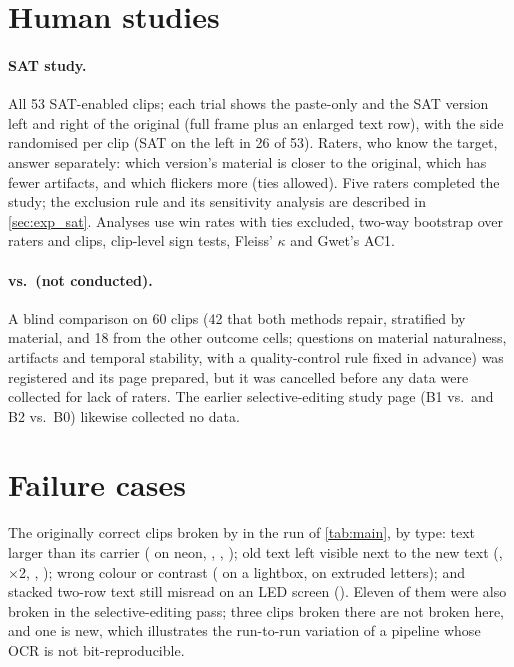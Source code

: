 \section{Human studies}
\label{sec:supp_human}
\paragraph{SAT study.} All 53 SAT-enabled clips; each trial shows the paste-only and the SAT version left and right of the original (full frame plus an enlarged text row), with the side randomised per clip (SAT on the left in 26 of 53). Raters, who know the target, answer separately: which version's material is closer to the original, which has fewer artifacts, and which flickers more (ties allowed). Five raters completed the study; the exclusion rule and its sensitivity analysis are described in \cref{sec:exp_sat}. Analyses use win rates with ties excluded, two-way bootstrap over raters and clips, clip-level sign tests, Fleiss' $\kappa$ and Gwet's AC1.

\paragraph{\method vs.\ \steer (not conducted).} A blind comparison on 60 clips (42 that both methods repair, stratified by material, and 18 from the other outcome cells; questions on material naturalness, artifacts and temporal stability, with a quality-control rule fixed in advance) was registered and its page prepared, but it was cancelled before any data were collected for lack of raters. The earlier selective-editing study page (B1 vs.\ \steer and B2 vs.\ B0) likewise collected no data.

\section{Failure cases}
\label{sec:supp_fail}
The \rOursBroken{} originally correct clips broken by \method in the run of \cref{tab:main}, by type: text larger than its carrier ( on neon, , , ); old text left visible next to the new text (,  $\times$2, , ); wrong colour or contrast ( on a lightbox,  on extruded letters); and stacked two-row text still misread on an LED screen (). Eleven of them were also broken in the selective-editing pass; three clips broken there are not broken here, and one is new, which illustrates the run-to-run variation of a pipeline whose OCR is not bit-reproducible.
